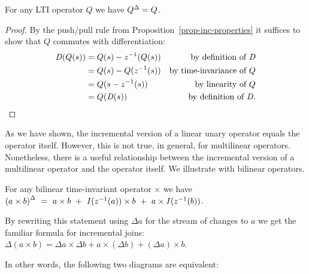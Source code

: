 
\begin{theorem}[Linear]\label{linear}
For any LTI operator $Q$ we have ${Q}^{\Delta}=Q$.
\end{theorem}

\begin{proof}
By the push/pull rule from Proposition~\ref{prop-inc-properties} 
it suffices to show that $Q$ commutes with differentiation:
$$
\begin{aligned}
  \mathit{D}(Q(s)) &= Q(s)-z^{-1}(Q(s)) & \mbox{by definition of }\mathit{D} \\
  &= Q(s)-Q(z^{-1}(s)) & \mbox{by time-invariance of }Q \\
  &= Q(s-z^{-1}(s)) & \mbox{by linearity of }Q \\
  &= Q(\mathit{D}(s)) & \mbox{by definition of }\mathit{D}.
\end{aligned}
$$
\end{proof}


As we have shown, the incremental version of a linear unary operator equals the operator itself.
However, this is not true, in general, for multilinear operators. Nonetheless, there is a useful relationship
between the incremental version of a multilinear operator and the operator itself. We illustrate with bilinear
operators. 
\begin{comment}
\val{Such as join. from incremental maintenance literature recall the definition of "delta" for join:
$\Delta(R\bowtie S) = R\bowtie(\Delta S) \cup (\Delta R)\bowtie S \cup (\Delta R)\bowtie(\Delta S)$.}
\mihai{Indeed, the join is the main application.  Should we hint at this?  It's the first
time the relational algebra will appear in this text.}
\end{comment}

\begin{theorem}[Bilinear]\label{bilinear}
For any bilinear time-invariant operator $\times$ we have
${(a \times b)}^{\Delta} ~=~ a \times b ~+~ \mathit{I}(z^{-1}(a)) \times b ~+~ a \times \mathit{I}(z^{-1}(b))$.
\end{theorem}

By rewriting this statement using $\Delta a$ for the stream of changes to $a$ we
get the familiar formula for incremental joins:
$\Delta(a\times b) =\Delta a \times \Delta b + a\times(\Delta b) + (\Delta a)\times b$.

In other words, the following two diagrams are equivalent:

